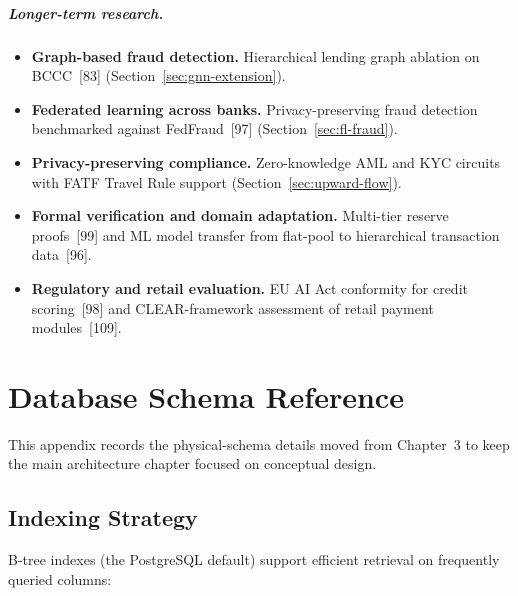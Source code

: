 \documentclass[12pt, a4paper]{report}
\begin{document}
\paragraph{Longer-term research.}
\begin{itemize}[noitemsep]
\item \textbf{Graph-based fraud detection.} Hierarchical lending graph ablation on BCCC~[83] (Section~\ref{sec:gnn-extension}).
\item \textbf{Federated learning across banks.} Privacy-preserving fraud detection benchmarked against FedFraud~[97] (Section~\ref{sec:fl-fraud}).
\item \textbf{Privacy-preserving compliance.} Zero-knowledge AML and KYC circuits with FATF Travel Rule support (Section~\ref{sec:upward-flow}).
\item \textbf{Formal verification and domain adaptation.} Multi-tier reserve proofs~[99] and ML model transfer from flat-pool to hierarchical transaction data~[96].
\item \textbf{Regulatory and retail evaluation.} EU AI Act conformity for credit scoring~[98] and CLEAR-framework assessment of retail payment modules~[109].
\end{itemize}

\appendix

\chapter{Database Schema Reference}
\label{app:db-schema-reference}

This appendix records the physical-schema details moved from Chapter~3 to keep the main architecture chapter focused on conceptual design.

\section{Indexing Strategy}

B-tree indexes (the PostgreSQL default) support efficient retrieval on frequently queried columns:
\end{document}
